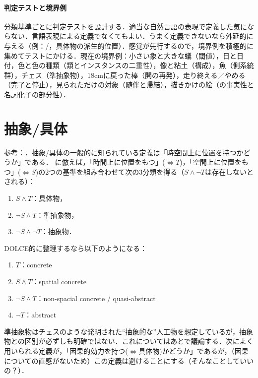 \documentclass[../../main-detail.tex]{subfiles}
\begin{document}
\paragraph{判定テストと境界例} 分類基準ごとに判定テストを設計する．適当な自然言語の表現で定義した気にならない．言語表現による定義でなくてもよい．うまく定義できないなら外延的に与える（例：/，具体物の派生的位置）．感覚が先行するので，境界例を積極的に集めてテストにかける．現在の境界例：小さい象と大きな蟻（閾値），日と日付，色と色の種類（類とインスタンスの二重性），像と粘土（構成），魚（側系統群），チェス（準抽象物），18cmに戻った棒（開の再発），走り終える／やめる（完了と停止），見られただけの対象（随伴と帰結），描きかけの絵（の事実性と名詞化子の部分性）．

\section{抽象/具体}
参考：\citet{sep-abstract}．抽象/具体の一般的に知られている定義は「時空間上に位置を持つかどうか」である．
\citet{mizoguchi2012}に倣えば，「時間上に位置をもつ」($\Leftrightarrow T$)，「空間上に位置をもつ」($\Leftrightarrow S$)の2つの基準を組み合わせて次の3分類を得る（$S \land \lnot T$は存在しないとされる）：
\begin{enumerate}
    \item $S \land T$：具体物，
    \item $\lnot S \land T$：準抽象物，
    \item $\lnot S \land \lnot T$：抽象物．
\end{enumerate}
DOLCE的に整理するなら以下のようになる：
\begin{enumerate}
    \item $T$：concrete
    \item $S \land T$：spatial concrete
    \item $\lnot S \land T$：non-spacial concrete / quasi-abstract
    \item $\lnot T$：abstract
\end{enumerate}
準抽象物はチェスのような発明された``抽象的な''人工物を想定しているが，抽象物との区別が必ずしも明確ではない．これについてはあとで議論する．次によく用いられる定義が，「因果的効力を持つ($\Leftrightarrow$具体物)かどうか」であるが，（因果についての直感がないため）この定義は避けることにする（そんなことしていいの？）．
\end{document}
